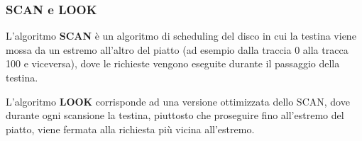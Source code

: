 \documentclass{article}
\begin{document}
\subsubsection{SCAN e LOOK}
L'algoritmo \textbf{SCAN} è un algoritmo di scheduling del disco in cui la testina viene mossa da un estremo all'altro del piatto (ad esempio dalla traccia 0 alla tracca 100 e viceversa), dove le richieste vengono eseguite durante il passaggio della testina.\par
L'algoritmo \textbf{LOOK} corrisponde ad una versione ottimizzata dello SCAN, dove durante ogni scansione la testina, piuttosto che proseguire fino all'estremo del piatto, viene fermata alla richiesta più vicina all'estremo.
\end{document}

